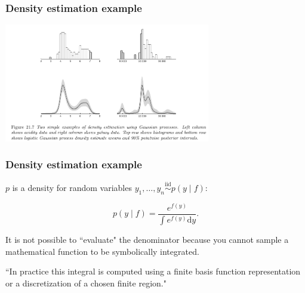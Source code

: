 \documentclass{beamer}
\begin{document}
\begin{frame}
\frametitle{Density estimation example}

\begin{center}
\includegraphics[width=90mm]{density_est.png}
\end{center}

\end{frame}

\begin{frame}
\frametitle{Density estimation example}

$p$ is a density for random variables $y_1, \ldots, y_n \overset{\text{iid}}{\sim} p(y \mid f)$: 

$$
p(y \mid f) = \frac{e^{f(y)} }{ \int e^{f(y)} \text{d}y }.
$$

It is not possible to ``evaluate" the denominator because you cannot sample a mathematical function to be symbolically integrated. 
\newline

``In practice this integral is computed using a finite basis function representation or a discretization of a chosen finite region." 

\end{frame}
\end{document}
